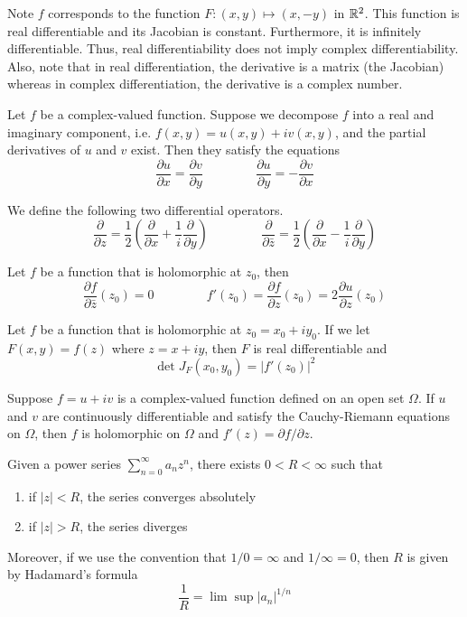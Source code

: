 \documentclass{mathnotes}
\newcommand{\pder}[2][]{\frac{\partial#1}{\partial#2}}
\newcommand{\ipder}[2][]{\partial#1/\partial#2}
\begin{document}
\begin{note}
  Note $f$ corresponds to the function $F:(x,y)\mapsto(x,-y)$ in
  $\mathbb{R}^2$. This function is real differentiable and its Jacobian is constant.
  Furthermore, it is infinitely differentiable. Thus, real differentiability
  does not imply complex differentiability. Also, note that in real
  differentiation, the derivative is a matrix (the Jacobian) whereas in complex
  differentiation, the derivative is a complex number.
\end{note}

\begin{bprop}
  Let $f$ be a complex-valued function. Suppose we decompose $f$ into a real
  and imaginary component, i.e. $f(x,y)=u(x,y)+iv(x,y)$, and the partial
  derivatives of $u$ and $v$ exist. Then they satisfy the equations
  $$\pder[u]{x}=\pder[v]{y}\hspace{50pt}\pder[u]{y}=-\pder[v]{x}$$
\end{bprop}

\begin{defi}
  We define the following two differential operators.
  $$\pder{z}=\frac{1}{2}\left(\pder{x}+\frac{1}{i}\pder{y}\right) \hspace{50pt}
  \pder{\bar z}=\frac{1}{2}\left(\pder{x}-\frac{1}{i}\pder{y}\right)$$
\end{defi}

\begin{prop}
  Let $f$ be a function that is holomorphic at $z_0$, then
  $$\pder[f]{\bar z}(z_0)=0\hspace{50pt}
  f'(z_0)=\pder[f]{z}(z_0)=2\pder[u]{z}(z_0)$$
\end{prop}

\begin{prop}
  Let $f$ be a function that is holomorphic at $z_0=x_0+iy_0$. If we let
  $F(x,y)=f(z)$ where $z=x+iy$, then $F$ is real differentiable and
  $$\det J_F(x_0,y_0)=|f'(z_0)|^2$$
\end{prop}

\begin{thm}
  Suppose $f=u+iv$ is a complex-valued function defined on an open set
  $\Omega$. If $u$ and $v$ are continuously differentiable and satisfy the
  Cauchy-Riemann equations on $\Omega$, then $f$ is holomorphic on $\Omega$ and
  $f'(z)=\ipder[f]{z}$.
\end{thm}

\begin{thm}
  Given a power series $\sum_{n=0}^\infty a_nz^n$, there exists $0<R<\infty$ such that
  \begin{enumerate}
    \item if $|z|<R$, the series converges absolutely
    \item if $|z|>R$, the series diverges
  \end{enumerate}
  Moreover, if we use the convention that $1/0=\infty$ and $1/\infty=0$, then
  $R$ is given by Hadamard's formula
  $$\frac{1}{R}=\lim\sup|a_n|^{1/n}$$
\end{thm}
\end{document}
